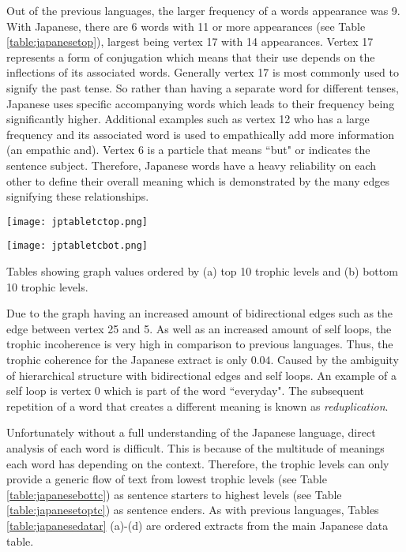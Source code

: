 Out of the previous languages, the larger frequency of a words appearance was 9. With Japanese, there are 6 words with 11 or more appearances (see Table \ref{table:japanesetop}), largest being vertex 17 with 14 appearances. Vertex 17 represents a form of conjugation which means that their use depends on the inflections of its associated words. Generally vertex 17 is most commonly used to signify the past tense. So rather than having a separate word for different tenses, Japanese uses specific accompanying words which leads to their frequency being significantly higher. Additional examples such as vertex 12 who has a large frequency and its associated word is used to empathically add more information (an empathic and). Vertex 6 is a particle that means ``but" or indicates the sentence subject. Therefore, Japanese words have a heavy reliability on each other to define their overall meaning which is demonstrated by the many edges signifying these relationships.

\begin{table}[!htb]
\centering
\begin{subtable}{.45\textwidth}
	\centering
	\texttt{[image: jptabletctop.png]}
	\caption{}
	\label{table:japanesentoptc}
\end{subtable}
\hfill
\begin{subtable}{.45\textwidth}
	\centering
	\texttt{[image: jptabletcbot.png]}
	\caption{}
	\label{table:japanesebottc}
\end{subtable}
\caption{Tables showing graph values ordered by (a) top 10 trophic levels and (b) bottom 10 trophic levels.}
\end{table}

Due to the graph having an increased amount of bidirectional edges such as the edge between vertex 25 and 5. As well as an increased amount of self loops, the trophic incoherence is very high in comparison to previous languages. Thus, the trophic coherence for the Japanese extract is only $0.04$. Caused by the ambiguity of hierarchical structure with bidirectional edges and self loops. An example of a self loop is vertex 0 which is part of the word ``everyday". The subsequent repetition of a word that creates a different meaning is known as \emph{reduplication}.

Unfortunately without a full understanding of the Japanese language, direct analysis of each word is difficult. This is because of the multitude of meanings each word has depending on the context. Therefore, the trophic levels can only provide a generic flow of text from lowest trophic levels (see Table \ref{table:japanesebottc}) as sentence starters to highest levels (see Table \ref{table:japanesetoptc})  as sentence enders. As with previous languages, Tables \ref{table:japanesedatar} (a)-(d) are ordered extracts from the main Japanese data table.

